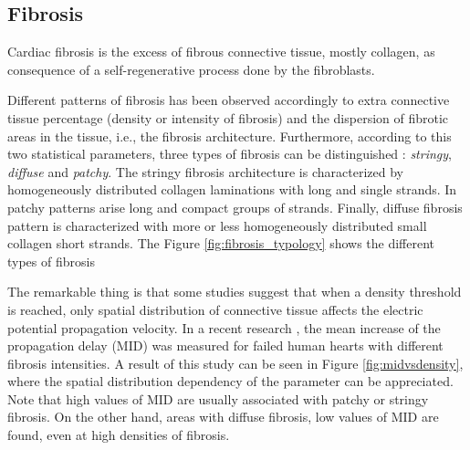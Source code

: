 \subsection{Fibrosis} \label{Fibrosis}

Cardiac fibrosis is the excess of fibrous connective tissue, mostly collagen, as consequence of a self-regenerative process done by the fibroblasts. 

Different patterns of fibrosis has been observed accordingly to extra connective tissue percentage (density or intensity of fibrosis) and the dispersion of fibrotic areas in the tissue, i.e., the fibrosis architecture. Furthermore, according to this two statistical parameters, three types of fibrosis can be distinguished \cite{Kawara2001Circ}: \textsl{stringy}, \textsl{diffuse} and \textsl{patchy}. The stringy fibrosis architecture is characterized by homogeneously distributed collagen laminations with long and single strands. In patchy patterns arise long and compact groups of strands. Finally, diffuse fibrosis pattern is characterized with more or less homogeneously distributed small collagen short strands. The Figure \ref{fig:fibrosis_typology} shows the different types of fibrosis

The remarkable thing is that some studies \cite{Comtois2011IEEE} suggest that when a density threshold is reached, only spatial distribution of connective tissue affects the electric potential propagation velocity. In a recent research \cite{Kawara2001Circ}, the mean increase of the propagation delay (MID) was measured for failed human hearts with different fibrosis intensities. A result of this study can be seen in Figure \ref{fig:midvsdensity}, where the spatial distribution dependency of the parameter can be appreciated. Note that high values of MID are usually associated with patchy or stringy fibrosis. On the other hand, areas with diffuse fibrosis, low values of MID are found, even at high densities of fibrosis.

